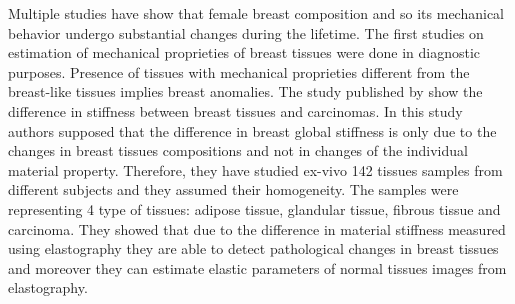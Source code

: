  Multiple studies have show that female breast composition and so its mechanical behavior undergo substantial changes during the lifetime.
The first studies on estimation of mechanical proprieties of breast tissues were done in diagnostic purposes. Presence of tissues with mechanical proprieties different from the breast-like tissues implies breast anomalies. The study published by \cite{krouskop_elastic_1998} show the difference in stiffness between breast tissues and carcinomas. In this study authors supposed that the difference in breast global stiffness is only due to the changes in breast tissues compositions and not in changes of the individual material property. Therefore, they have studied ex-vivo 142 tissues samples from different subjects and they assumed their homogeneity. The samples were representing 4 type of tissues: adipose tissue, glandular tissue, fibrous tissue and carcinoma. They showed that due to the difference in material stiffness measured using elastography they are able to detect pathological changes in breast tissues and moreover they can estimate elastic parameters of normal tissues images from elastography.  


